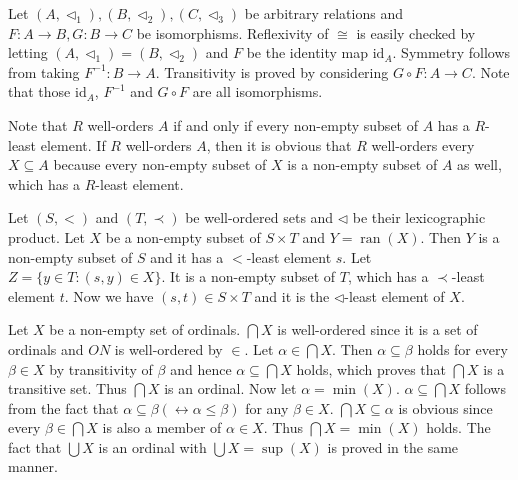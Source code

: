 \documentclass[12pt]{article}
\newcommand{\ran}{\mathop{\mathrm{ran}}}
\theoremstyle{definition}
\newenvironment{customthm}[1]
  {\renewcommand\theinnercustomthm{#1}\innercustomthm}
  {\endinnercustomthm}
\begin{document}
\begin{customthm}{I.7.17} Let $(A,\triangleleft_1),(B,\triangleleft_2),(C,\triangleleft_3)$ be arbitrary relations and $F:A\rightarrow B,G:B\rightarrow C$ be isomorphisms. Reflexivity of $\cong$ is easily checked by letting $(A,\triangleleft_1)=(B,\triangleleft_2)$ and $F$ be the identity map $\mathrm{id}_A$. Symmetry follows from taking $F^{-1}:B\rightarrow A$. Transitivity is proved by considering $G\circ F:A\rightarrow C$. Note that those $\mathrm{id}_A$, $F^{-1}$ and $G\circ F$ are all isomorphisms.
\end{customthm}

\begin{customthm}{I.7.21} Note that $R$ well-orders $A$ if and only if every non-empty subset of $A$ has a $R$-least element. If $R$ well-orders $A$, then it is obvious that $R$ well-orders every $X\subseteq A$ because every non-empty subset of $X$ is a non-empty subset of $A$ as well, which has a $R$-least element.
\end{customthm}

\begin{customthm}{I.7.23} Let $(S,<)$ and $(T,\prec)$ be well-ordered sets and $\triangleleft$ be their lexicographic product. Let $X$ be a non-empty subset of $S\times T$ and $Y = \ran(X)$. Then $Y$ is a non-empty subset of $S$ and it has a $<$-least element $s$. Let $Z=\{y\in T:(s,y)\in X\}$. It is a non-empty subset of $T$, which has a $\prec$-least element $t$. Now we have $(s,t)\in S\times T$ and it is the $\triangleleft$-least element of $X$.
\end{customthm}

\begin{customthm}{I.8.10} Let $X$ be a non-empty set of ordinals. $\bigcap X$ is well-ordered since it is a set of ordinals and $ON$ is well-ordered by $\in$. Let $\alpha\in\bigcap X$. Then $\alpha\subseteq\beta$ holds for every $\beta\in X$ by transitivity of $\beta$ and hence $\alpha\subseteq\bigcap X$ holds, which proves that $\bigcap X$ is a transitive set. Thus $\bigcap X$ is an ordinal. Now let $\alpha=\min(X)$. $\alpha\subseteq\bigcap X$ follows from the fact that $\alpha\subseteq\beta(\leftrightarrow\alpha\leq\beta)$ for any $\beta\in X$. $\bigcap X\subseteq\alpha$ is obvious since every $\beta\in\bigcap X$ is also a member of $\alpha\in X$. Thus $\bigcap X=\min(X)$ holds. The fact that $\bigcup X$ is an ordinal with $\bigcup X=\sup(X)$ is proved in the same manner.
\end{customthm}
\end{document}
